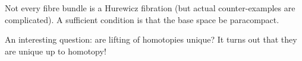 \begin{remark}
Not every fibre bundle is a Hurewicz fibration (but actual counter-examples are complicated). A sufficient condition is that the base space be paracompact.
\end{remark}

\begin{remark}

An interesting question: are lifting of homotopies unique? It turns out that they are unique up to homotopy!
\begin{center}
    \qquad
\end{center}\normalmarginpar{}

\end{remark}
